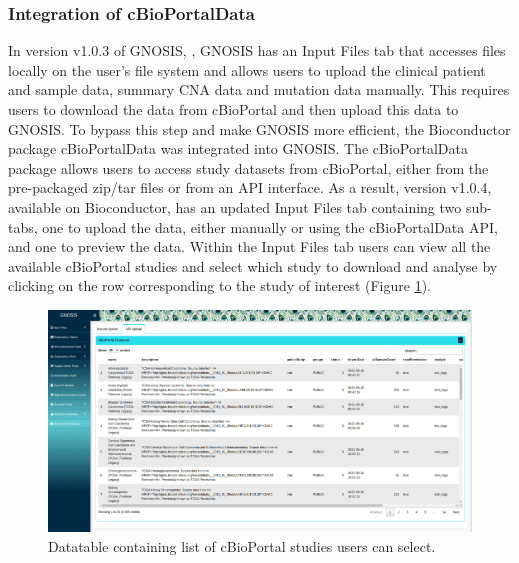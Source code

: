 \subsubsection{Integration of cBioPortalData}

In version v1.0.3 of GNOSIS, \cite{King_GNOSIS}, GNOSIS has an Input Files tab that accesses files locally on the user’s file system and allows users to upload the clinical patient and sample data, summary CNA data and mutation data manually. This requires users to download the data from cBioPortal and then upload this data to GNOSIS. To bypass this step and make GNOSIS more efficient, the Bioconductor package cBioPortalData \citep{cBioPortalData} was integrated into GNOSIS. The cBioPortalData package allows users to access study datasets from cBioPortal, either from the pre-packaged zip/tar files or from an API interface. As a result, version v1.0.4, available on Bioconductor, has an updated Input Files tab containing two sub-tabs, one to upload the data, either manually or using the cBioPortalData API, and one to preview the data. Within the Input Files tab users can view all the available cBioPortal studies and select which study to download and analyse by clicking on the row corresponding to the study of interest (Figure \ref{fig:cBio}).

\vfill 

\begin{figure}[H]
\begin{center}
\includegraphics[width=1\textwidth]{../figures/Chapter_3/GNOSIS_CBIO.png}
\end{center}
\caption[Datatable containing list of cBioPortal studies users can select.]{Datatable containing list of cBioPortal studies users can select.}
\label{fig:cBio}
\end{figure} 

\vfill 

